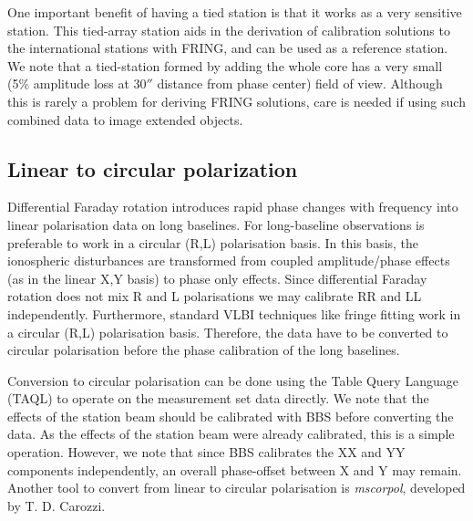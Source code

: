 \documentclass[graybox]{svmult}
\begin{document}
One important benefit of having a tied station is that it works as a very
sensitive station. This tied-array station aids in the derivation of
calibration solutions to the international stations with FRING, and can be used
as a reference station. We note that a tied-station formed by adding the whole
core has a very small (5\% amplitude loss at 30$''$ distance from phase center)
field of view. Although this is rarely a problem for deriving FRING solutions,
care is needed if using such combined data to image extended objects.




\subsection{Linear to circular polarization}

Differential Faraday rotation introduces rapid phase changes with frequency
into linear polarisation data on long baselines. For long-baseline observations
is preferable to work in a circular (R,L) polarisation basis. In this basis,
the ionospheric disturbances are transformed from coupled amplitude/phase
effects (as in the linear X,Y basis) to phase only effects. Since differential
Faraday rotation does not mix R and L polarisations we may calibrate RR and LL
independently. Furthermore, standard VLBI techniques like fringe fitting work
in a circular (R,L) polarisation basis. Therefore, the data have to be
converted to circular polarisation before the phase calibration of the long
baselines.

Conversion to circular polarisation can be done using the Table Query Language
(TAQL) to operate on the measurement set data directly. We note that the
effects of the station beam should be calibrated with BBS before converting the
data. As the effects of the station beam were already calibrated, this is a
simple operation. However, we note that since BBS calibrates the XX and YY
components independently, an overall phase-offset between X and Y may remain.
Another tool to convert from linear to circular polarisation is
\emph{mscorpol}, developed by T. D. Carozzi.
\end{document}
